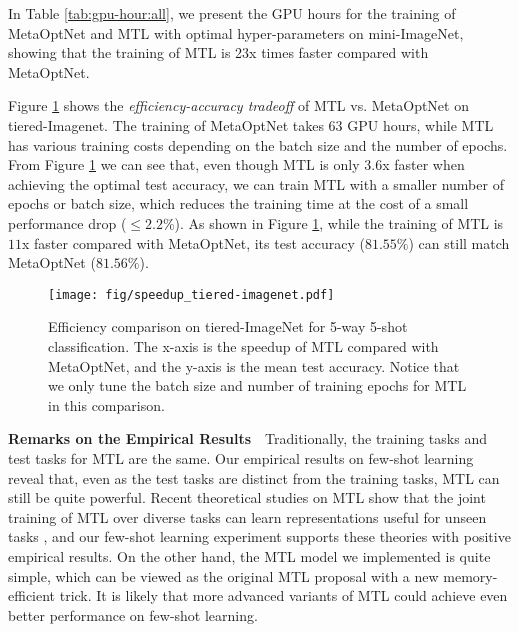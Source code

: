 \documentclass{article}
\begin{document}
In Table \ref{tab:gpu-hour:all}, we present the GPU hours for the training of MetaOptNet and MTL with optimal hyper-parameters on mini-ImageNet, showing that the training of MTL is 23x times faster compared with MetaOptNet. 

Figure \ref{fig:speedup-tiered-imagenet} shows the \textit{efficiency-accuracy tradeoff} of MTL vs. MetaOptNet on tiered-Imagenet. The training of MetaOptNet takes $63$ GPU hours, while MTL has various training costs depending on the batch size and the number of epochs. From Figure \ref{fig:speedup-tiered-imagenet} we can see that, even though MTL is only $3.6$x faster when achieving the optimal test accuracy, we can train MTL with a smaller number of epochs or batch size, which reduces the training time at the cost of a small performance drop ($\le 2.2\%$). As shown in Figure \ref{fig:speedup-tiered-imagenet}, while the training of MTL is $11$x faster compared with MetaOptNet, its test accuracy ($81.55\%$) can still match MetaOptNet ($81.56\%$).
\begin{figure}[t!]
    \centering
    \texttt{[image: fig/speedup\_tiered-imagenet.pdf]}
    \vspace{-0.7em}
    \caption{Efficiency comparison on tiered-ImageNet for 5-way 5-shot classification. The x-axis is the speedup of MTL compared with MetaOptNet, and the y-axis is the mean test accuracy. Notice that we only tune the batch size and number of training epochs for MTL in this comparison.}
    \label{fig:speedup-tiered-imagenet}
    \vspace{-1em}
\end{figure}


\textbf{Remarks on the Empirical Results}~~Traditionally, the training tasks and test tasks for MTL are the same. Our empirical results on few-shot learning reveal that, even as the test tasks are distinct from the training tasks, MTL can still be quite powerful. Recent theoretical studies on MTL show that the joint training of MTL over diverse tasks can learn representations useful for unseen tasks \citep{tripuraneni2020theory,du2021fewshot}, and our few-shot learning experiment supports these theories with positive empirical results. On the other hand, the MTL model we implemented is quite simple, which can be viewed as the original MTL proposal \citep{caruana1997multitask} with a new memory-efficient trick. It is likely that more advanced variants of MTL could achieve even better performance on few-shot learning.
\vspace{-0.5em}
\end{document}

